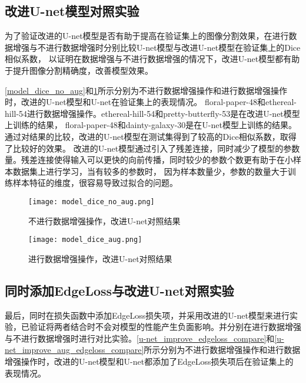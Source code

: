 \documentclass[AutoFakeBold]{LZUThesis}
\begin{document}
\subsection{改进U-net模型对照实验}
为了验证改进的U-net模型是否有助于提高在验证集上的图像分割效果，在进行数据增强与不进行数据增强时分别比较U-net模型与改进U-net模型在验证集上的Dice相似系数，
以证明在数据增强与不进行数据增强的情况下，改进U-net模型都有助于提升图像分割精确度，改善模型效果。

\cref{model_dice_no_aug}和\cref{model_dice_aug}所示分别为不进行数据增强操作和进行数据增强操作时，改进的U-net模型和U-net在验证集上的表现情况。
floral-paper-48和ethereal-hill-54进行数据增强操作。ethereal-hill-54和pretty-butterfly-53是在改进U-net模型上训练的结果，
floral-paper-48和dainty-galaxy-30是在U-net模型上训练的结果。通过对结果的比较，改进的U-net模型在测试集得到了较高的Dice相似系数，取得了比较好的效果。
改进的U-net模型通过引入了残差连接，同时减少了模型的参数量。残差连接使得输入可以更快的向前传播，同时较少的参数个数更有助于在小样本数据集上进行学习，当有较多的参数时，
因为样本数量少，参数的数量大于训练样本特征的维度，很容易导致过拟合的问题。


\begin{figure}[htbp]
    \centering
    \begin{minipage}[t]{0.45\linewidth}  %
        \centering
        \texttt{[image: model\_dice\_no\_aug.png]}
        \caption{不进行数据增强操作，改进U-net对照结果}
        \label{model_dice_no_aug}
    \end{minipage}
    \hfill%
    \begin{minipage}[t]{0.45\linewidth}
        \centering
        \texttt{[image: model\_dice\_aug.png]}
        \caption{进行数据增强操作，改进U-net对照结果}
        \label{model_dice_aug}
    \end{minipage}
\end{figure}

\subsection{同时添加EdgeLoss与改进U-net对照实验}
最后，同时在损失函数中添加EdgeLoss损失项，并采用改进的U-net模型来进行实验，已验证将两者结合时不会对模型的性能产生负面影响。并分别在进行数据增强与不进行数据增强时进行对比实验。\cref{u-net_improve_edgeloss_compare}和\cref{u-net_improve_aug_edgeloss_compare}所示分别为不进行数据增强操作和进行数据增强操作时，改进的U-net模型和U-net都添加了EdgeLoss损失项后在验证集上的表现情况。
\end{document}

